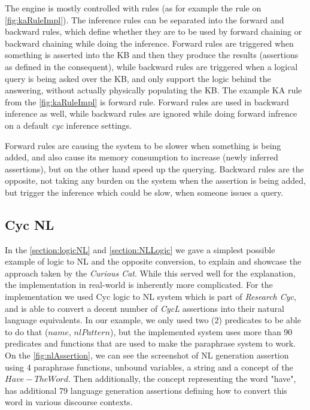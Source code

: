The engine is mostly controlled with rules (as for example the rule on 
\autoref{fig:kaRuleImpl}). The inference rules can be separated
into the forward and backward rules, which define whether they are to be used
by forward chaining or backward chaining while doing the inference. Forward
rules are triggered when something is asserted into the KB and then they produce
the results (assertions as defined in the consequent), while backward rules
are triggered when a logical query is being asked over the KB, and only support
the logic behind the answering, without actually physically populating the KB.
The example KA rule from the \autoref{fig:kaRuleImpl} is forward rule. Forward
rules are used in backward inference as well, while backward rules are ignored
while doing forward infrence on a default \emph{cyc} inference settings.

Forward rules are causing the system to be slower when something is being added,
and also cause its memory consumption to increase (newly inferred assertions),
but on the other hand speed up the querying. Backward rules are the opposite,
not taking any burden on the system when the assertion is being added, but
trigger the inference which could be slow, when someone issues a query.

\subsection{Cyc NL}
\label{section:cycnl}
In the \autoref{section:logicNL} and \autoref{section:NLLogic} we gave a 
simplest possible 
example of logic to NL and the opposite conversion, to explain and showcase the
approach taken by the \emph{Curious Cat}. While this served well for the
explanation, the implementation in real-world is inherently more complicated.
For the implementation we used Cyc logic to NL system which is part of 
\emph{Research Cyc}\autocite{Coppock2010,Baxter2005}, and is able to convert
a decent number of \emph{CycL} assertions into their natural language 
equivalents. In our example, we only used two (2) predicates to be able to
do that ($name$, $nlPattern$), but the implemented system uses more than
90 predicates and functions that are used to make the paraphrase system to work.
On the \autoref{fig:nlAssertion}, we can see the screenshot of
NL generation assertion using 4 paraphrase functions, unbound variables,
a string and a concept of the $Have-TheWord$. Then additionally, the concept
representing the word "have", has additional 79 language generation assertions
defining how to convert this word in various discourse contexts. 

